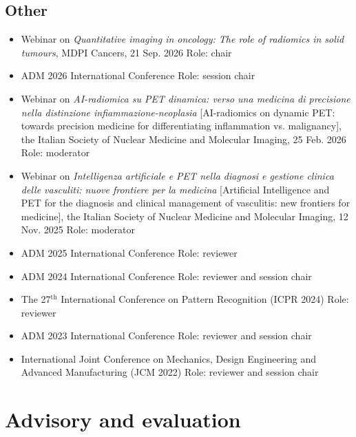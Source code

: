 \documentclass[11pt]{article}
\begin{document}
\subsection*{Other}
\begin{itemize}
	\item Webinar on \emph{Quantitative imaging in oncology: The role of radiomics in solid tumours}, MDPI Cancers, 21 Sep. 2026 \hfill Role: chair
	\item ADM 2026 International Conference \hfill Role: session chair
	\item Webinar on \emph{AI-radiomica su PET dinamica: verso una medicina di precisione nella distinzione infiammazione-neoplasia} [AI-radiomics on dynamic PET: towards precision medicine for differentiating inflammation vs. malignancy], the Italian Society of Nuclear Medicine and Molecular Imaging, 25 Feb. 2026 \hfill Role: moderator
	\item Webinar on \emph{Intelligenza artificiale e PET nella diagnosi e gestione clinica delle vasculiti: nuove frontiere per la medicina} [Artificial Intelligence and PET for the diagnosis and clinical management of vasculitis: new frontiers for medicine], the Italian Society of Nuclear Medicine and Molecular Imaging, 12 Nov. 2025 \hfill Role: moderator
	\item ADM 2025 International Conference \hfill Role: reviewer
	\item ADM 2024 International Conference \hfill Role: reviewer and session chair
	\item The 27$^\text{th}$ International Conference on Pattern Recognition (ICPR 2024) \hfill Role: reviewer
	\item ADM 2023 International Conference \hfill Role: reviewer and session chair
	\item International Joint Conference on Mechanics, Design Engineering and Advanced Manufacturing (JCM 2022) \hfill Role: reviewer and session chair
\end{itemize} 

\section*{Advisory and evaluation}
\end{document}
